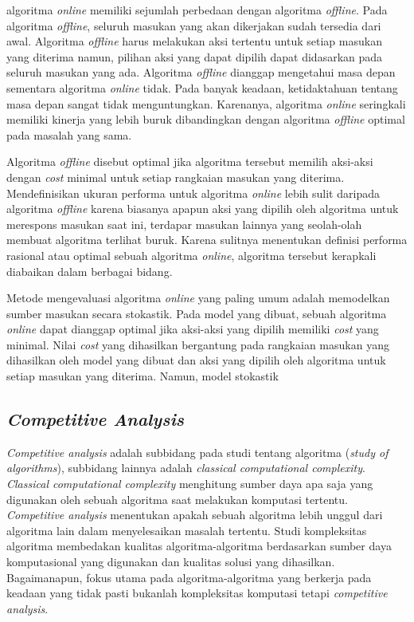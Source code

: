 \par algoritma \textit{online} memiliki sejumlah perbedaan dengan algoritma \textit{offline}. Pada algoritma \textit{offline}, seluruh masukan yang akan dikerjakan sudah tersedia dari awal. Algoritma \textit{offline} harus melakukan aksi tertentu untuk setiap masukan yang diterima namun, pilihan aksi yang dapat dipilih dapat didasarkan pada seluruh masukan yang ada. Algoritma \textit{offline} dianggap mengetahui masa depan sementara algoritma \textit{online} tidak. Pada banyak keadaan, ketidaktahuan tentang masa depan sangat tidak menguntungkan. Karenanya, algoritma \textit{online} seringkali memiliki kinerja yang lebih buruk dibandingkan dengan algoritma \textit{offline} optimal pada masalah yang sama.

\par Algoritma \textit{offline} disebut optimal jika algoritma tersebut memilih aksi-aksi dengan \textit{cost} minimal untuk setiap rangkaian masukan yang diterima. Mendefinisikan ukuran performa untuk algoritma \textit{online} lebih sulit daripada algoritma \textit{offline} karena biasanya apapun aksi yang dipilih oleh algoritma untuk merespons masukan saat ini, terdapar masukan lainnya yang seolah-olah membuat algoritma terlihat buruk. Karena sulitnya menentukan definisi performa rasional atau optimal sebuah algoritma \textit{online}, algoritma tersebut kerapkali diabaikan dalam berbagai bidang.

\par Metode mengevaluasi algoritma \textit{online} yang paling umum adalah memodelkan sumber masukan secara stokastik. Pada model yang dibuat, sebuah algoritma \textit{online} dapat dianggap optimal jika aksi-aksi yang dipilih memiliki \textit{cost} yang minimal. Nilai \textit{cost} yang dihasilkan bergantung pada rangkaian masukan yang dihasilkan oleh model yang dibuat dan aksi yang dipilih oleh algoritma untuk setiap masukan yang diterima. Namun, model stokastik  \cite{algo_online_4:92}
 

\subsection{\textit{Competitive Analysis}}
\par \textit{Competitive analysis} adalah subbidang pada studi tentang algoritma (\textit{study of algorithms}), subbidang lainnya adalah \textit{classical computational complexity}. \textit{Classical computational complexity} menghitung sumber daya apa saja yang digunakan oleh sebuah algoritma saat melakukan komputasi tertentu. \textit{Competitive analysis} menentukan apakah sebuah algoritma lebih unggul dari algoritma lain dalam menyelesaikan masalah tertentu. Studi kompleksitas algoritma membedakan kualitas algoritma-algoritma berdasarkan sumber daya komputasional yang digunakan dan kualitas solusi yang dihasilkan. Bagaimanapun, fokus utama pada algoritma-algoritma yang berkerja pada keadaan yang tidak pasti bukanlah kompleksitas komputasi tetapi \textit{competitive analysis}.

